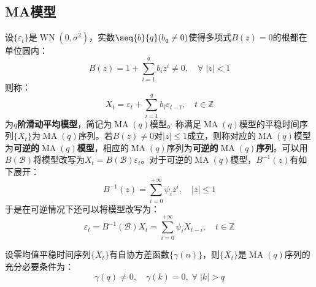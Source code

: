 \subsection{MA模型}
\begin{definition}
	设$\{\varepsilon_t\}$是$\operatorname{WN}(0,\sigma^2)$，实数$\seq{b}{q}(b_q\ne0)$使得多项式$B(z)=0$的根都在单位圆内：
	\begin{equation*}
		B(z)=1+\sum_{i=1}^{q}b_iz^i\ne0,\quad\forall\;|z|<1
	\end{equation*}
	则称：
	\begin{equation*}
		X_t=\varepsilon_t+\sum_{i=1}^{q}b_i\varepsilon_{t-i},\quad t\in\mathbb{Z}
	\end{equation*}
	为\textbf{$q$阶滑动平均模型}，简记为$\operatorname{MA}(q)$模型。称满足$\operatorname{MA}(q)$模型的平稳时间序列$\{X_t\}$为$\operatorname{MA}(q)$序列。若$B(z)\ne0$对$|z|\leqslant1$成立，则称对应的$\operatorname{MA}(q)$模型为\textbf{可逆的$\operatorname{MA}(q)$模型}，相应的$\operatorname{MA}(q)$序列为\textbf{可逆的$\operatorname{MA}(q)$序列}。可以用$B(\mathcal{B})$将模型改写为$X_t=B(\mathcal{B})\varepsilon_t$。对于可逆的$\operatorname{MA}(q)$模型，$B^{-1}(z)$有如下展开：
	\begin{equation*}
		B^{-1}(z)=\sum_{i=0}^{+\infty}\psi_iz^i,\quad |z|\leqslant1
	\end{equation*}
	于是在可逆情况下还可以将模型改写为：
	\begin{equation*}
		\varepsilon_t=B^{-1}(\mathcal{B})X_t=\sum_{i=0}^{+\infty}\psi_iX_{t-i},\quad t\in\mathbb{Z}^{}
	\end{equation*}
\end{definition}
\begin{theorem}
	设零均值平稳时间序列$\{X_t\}$有自协方差函数$\{\gamma(n)\}$，则$\{X_t\}$是$\operatorname{MA}(q)$序列的充分必要条件为：
	\begin{equation*}
		\gamma(q)\ne 0,\quad\gamma(k)=0,\;\forall\;|k|>q
	\end{equation*}
\end{theorem}
